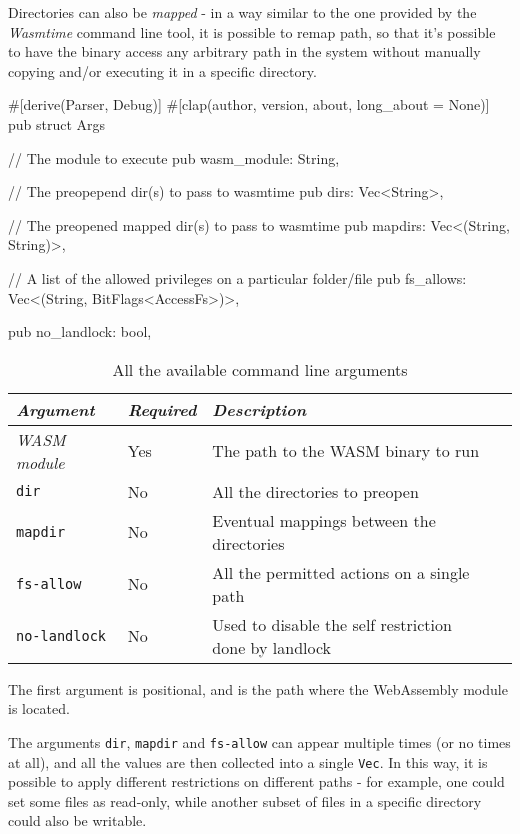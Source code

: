 Directories can also be \textit{mapped} - in a way similar to the one provided by the \textit{Wasmtime} command line tool,
it is possible to remap path, so that it's possible to have the binary access any arbitrary path in the system
without manually copying and/or executing it in a specific directory.

\begin{code}[language=rust, caption=The \texttt{Args} struct, label=lst:arg-struct]
  #[derive(Parser, Debug)]
  #[clap(author, version, about, long_about = None)]
  pub struct Args {
    // The module to execute
    pub wasm_module: String,

    // The preopepend dir(s) to pass to wasmtime
    pub dirs: Vec<String>,

    // The preopened mapped dir(s) to pass to wasmtime
    pub mapdirs: Vec<(String, String)>,

    // A list of the allowed privileges on a particular folder/file
    pub fs_allows: Vec<(String, BitFlags<AccessFs>)>,

    pub no_landlock: bool,
  }
\end{code}

\begin{table}
  \centering
  \begin{tabular}{|l|l|l|l|}
    \hline
    \textit{Argument} & \textit{Required} & \textit{Description} \\
    \hline\hline
    \textit{WASM module} & Yes & The path to the WASM binary to run \\ \hline
    \texttt{dir} & No & All the directories to preopen \\ \hline
    \texttt{mapdir} & No & Eventual mappings between the directories \\ \hline
    \texttt{fs-allow} & No & All the permitted actions on a single path \\ \hline
    \texttt{no-landlock} & No & Used to disable the self restriction done by landlock \\
    \hline
  \end{tabular}
  \caption{All the available command line arguments}
  \label{table:landlock-cli-args}
\end{table}

The first argument is positional, and is the path where the WebAssembly module is located.

The arguments \texttt{dir}, \texttt{mapdir} and \texttt{fs-allow} can appear multiple times (or no times at all), and all the values
are then collected into a single \texttt{Vec}. In this way, it is possible to apply different restrictions on different
paths - for example, one could set some files as read-only, while another subset of files in a specific directory
could also be writable.

